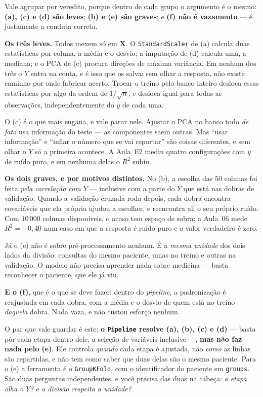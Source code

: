 \documentclass[11pt,a4paper]{article}
\begin{document}
\begin{solucao}
Vale agrupar por veredito, porque dentro de cada grupo o argumento é o mesmo:
\textbf{(a), (c) e (d) são leves}; \textbf{(b) e (e) são graves}; e \textbf{(f)
não é vazamento} --- é justamente a conduta correta.

\medskip
\textbf{Os três leves.} Todos mexem só em $\bm X$. O \texttt{StandardScaler} de
(a) calcula duas estatísticas por coluna, a média e o desvio; a imputação de (d)
calcula uma, a mediana; e o PCA de (c) procura direções de máxima variância. Em
nenhum dos três o $Y$ entra na conta, e é isso que os salva: sem olhar a resposta,
não existe caminho por onde fabricar acerto. Trocar o treino pelo banco inteiro
desloca essas estatísticas por algo da ordem de $1/\sqrt n$, e desloca igual para
todas as observações, independentemente do $y$ de cada uma.

O (c) é o que mais engana, e vale parar nele. Ajustar o PCA no banco todo
\emph{de fato} usa informação do teste --- as componentes saem outras. Mas ``usar
informação'' e ``inflar o número que se vai reportar'' são coisas diferentes, e
sem olhar o $Y$ só a primeira acontece. A Aula~E2 mediu quatro configurações com
$y$ de ruído puro, e em nenhuma delas o $R^2$ subiu.

\medskip
\textbf{Os dois graves, e por motivos distintos.} No (b), a escolha das $50$
colunas foi feita \emph{pela correlação com $Y$} --- inclusive com a parte do $Y$
que está nas dobras de validação. Quando a validação cruzada roda depois, cada
dobra encontra covariáveis que ela própria ajudou a escolher, e reencontra ali o
seu próprio ruído. Com $10\,000$ colunas disponíveis, o acaso tem espaço de sobra:
a Aula~06 mede $R^2 = +0{,}40$ num caso em que a resposta é ruído puro e o valor
verdadeiro é zero.

Já o (e) não é sobre pré-processamento nenhum. É a \emph{mesma unidade} dos dois
lados da divisão: consultas do mesmo paciente, umas no treino e outras na
validação. O modelo não precisa aprender nada sobre medicina --- basta reconhecer
o paciente, que ele já viu.

\medskip
\textbf{E o (f)}, que é o que se deve fazer: dentro do \emph{pipeline}, a
padronização é reajustada em cada dobra, com a média e o desvio de quem está no
treino \emph{daquela} dobra. Nada vaza, e não custou esforço nenhum.

\medskip
O par que vale guardar é este: \textbf{o \texttt{Pipeline} resolve (a), (b), (c) e
(d)} --- basta pôr cada etapa dentro dele, a seleção de variáveis inclusive ---,
\textbf{mas não faz nada pelo (e)}. Ele controla \emph{quando} cada etapa é
ajustada, não \emph{como} as linhas são repartidas, e não tem como saber que duas
delas são o mesmo paciente. Para o (e) a ferramenta é o \texttt{GroupKFold}, com o
identificador do paciente em \texttt{groups}. São duas perguntas independentes, e
você precisa das duas na cabeça: \emph{a etapa olha o $Y$?} e \emph{a divisão
respeita a unidade?}
\end{solucao}
\end{document}

